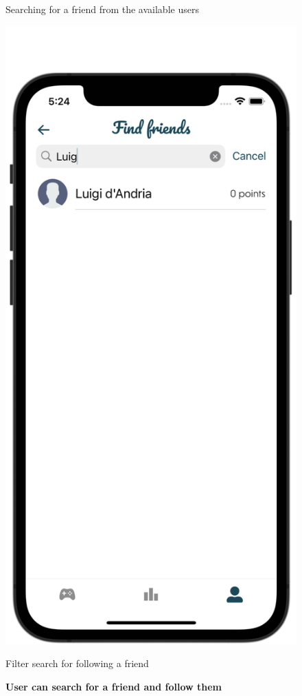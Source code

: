 \begin{figure}[H]
\begin{minipage}[b]{0.43\linewidth}
        \caption{Searching for a friend from the available users}
    \end{minipage}
    \hspace{0.1\linewidth}
    \begin{minipage}[b]{0.43\linewidth}
        \centering
        \includegraphics[width=\linewidth]{Mobile UI/Find Friends 1.png}
        \caption{Filter search for following a friend}
    \end{minipage}
    \vspace{0.5cm}
    \caption{\textbf{User can search for a friend and follow them}}
\end{figure}


